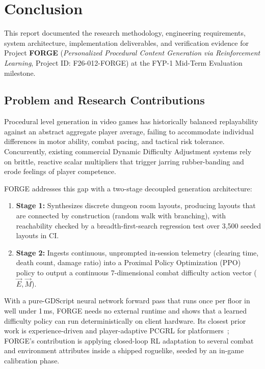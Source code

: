 \chapter{Conclusion}
\label{chap:conclusion}

This report documented the research methodology, engineering requirements, system architecture, implementation deliverables, and verification evidence for Project \textbf{FORGE} (\textit{Personalized Procedural Content Generation via Reinforcement Learning}, Project ID: F26-012-FORGE) at the FYP-1 Mid-Term Evaluation milestone.

\section*{Problem and Research Contributions}
Procedural level generation in video games has historically balanced replayability against an abstract aggregate player average, failing to accommodate individual differences in motor ability, combat pacing, and tactical risk tolerance. Concurrently, existing commercial Dynamic Difficulty Adjustment systems rely on brittle, reactive scalar multipliers that trigger jarring rubber-banding and erode feelings of player competence. 

FORGE addresses this gap with a two-stage decoupled generation architecture:
\begin{enumerate}
    \item \textbf{Stage 1:} Synthesizes discrete dungeon room layouts, producing layouts that are connected by construction (random walk with branching), with reachability checked by a breadth-first-search regression test over 3,500 seeded layouts in CI.
    \item \textbf{Stage 2:} Ingests continuous, unprompted in-session telemetry (clearing time, death count, damage ratio) into a Proximal Policy Optimization (PPO) policy to output a continuous 7-dimensional combat difficulty action vector ($\vec{E}, \vec{M}$).
\end{enumerate}
With a pure-GDScript neural network forward pass that runs once per floor in well under 1\,ms, FORGE needs no external runtime and shows that a learned difficulty policy can run deterministically on client hardware. Its closest prior work is experience-driven and player-adaptive PCGRL for platformers~\cite{shu2021edrl, wang2022oparl}; FORGE's contribution is applying closed-loop RL adaptation to several combat and environment attributes inside a shipped roguelike, seeded by an in-game calibration phase.

